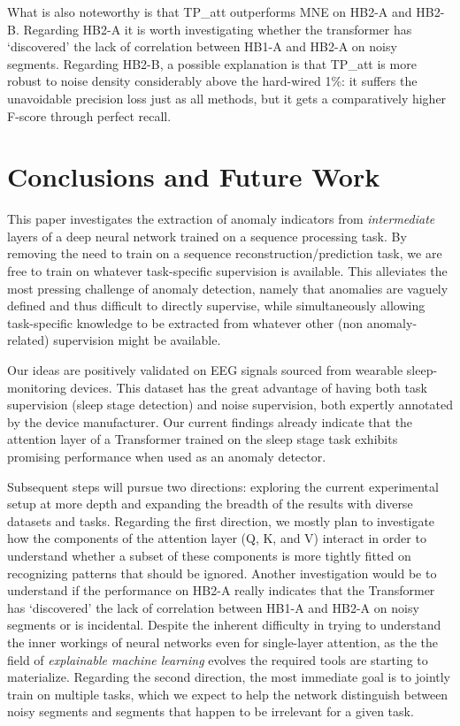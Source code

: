 \documentclass[runningheads]{llncs}
\begin{document}
What is also noteworthy is that TP\_att outperforms MNE on HB2-A and HB2-B.
Regarding HB2-A it is worth investigating whether the transformer has
`discovered' the lack of correlation between HB1-A and HB2-A on noisy
segments. Regarding HB2-B, a possible explanation is that TP\_att is
more robust to noise density considerably above the hard-wired 1\%: it
suffers the unavoidable precision loss just as all methods, but it
gets a comparatively higher F-score through perfect recall.



\section{Conclusions and Future Work}
\label{sec:conc}

This paper investigates the extraction of anomaly indicators from
\emph{intermediate} layers of a deep neural network trained on a
sequence processing task. By removing the need to train on a sequence
reconstruction/prediction task, we are free to train on whatever
task-specific supervision is available. This alleviates the most
pressing challenge of anomaly detection, namely that anomalies are
vaguely defined and thus difficult to directly supervise, while
simultaneously allowing task-specific knowledge to be extracted from
whatever other (non anomaly-related) supervision might be available.

Our ideas are positively validated on EEG signals sourced from
wearable sleep-monitoring devices. This dataset has the great
advantage of having both task supervision (sleep stage detection) and
noise supervision, both expertly annotated by the device manufacturer.
Our current findings already indicate that the attention layer of a
Transformer trained on the sleep stage task exhibits promising
performance when used as an anomaly detector.

Subsequent steps will pursue two directions: exploring the current
experimental setup at more depth and expanding the breadth of the
results with diverse datasets and tasks. Regarding the first direction,
we mostly plan to investigate how the components of the attention
layer (Q, K, and V) interact in order to understand whether a subset 
of these components is more tightly fitted on
recognizing patterns that should be ignored. Another investigation
would be to understand if the performance on HB2-A really indicates
that the Transformer has `discovered' the lack of correlation between
HB1-A and HB2-A on noisy segments or is incidental. Despite the
inherent difficulty in trying to understand the inner workings of
neural networks even for single-layer attention, as the the field
of \emph{explainable machine learning} evolves the required tools
are starting to materialize.
%
Regarding the second direction, the most immediate goal is to jointly
train on multiple tasks, which we expect to help the network
distinguish between noisy segments and segments that happen to be
irrelevant for a given task.
\end{document}

